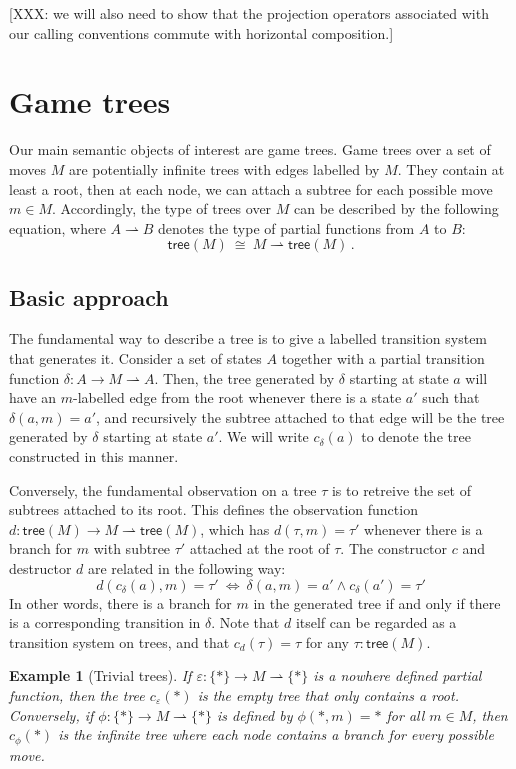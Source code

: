 \documentclass[11pt]{article}
\newcommand{\kw}[1]{{\mathsf{#1}}}
\newtheorem{example}{Example}
\begin{document}
[XXX: we will also need to show that the projection operators
associated with our calling conventions
commute with horizontal composition.]


\section{Game trees}

Our main semantic objects of interest are game trees.
Game trees over a set of moves $M$
are potentially infinite trees with
edges labelled by $M$.
They contain at least a root,
then at each node,
we can attach a subtree
for each possible move $m \in M$.
Accordingly,
the type of trees over $M$ can be described by the following equation,
where $A \rightharpoonup B$ denotes the type of
partial functions from $A$ to $B$:
\[
    \kw{tree}(M) \:\cong\: M \rightharpoonup \kw{tree}(M) \,.
\]

\subsection{Basic approach}

The fundamental way to describe a tree is to
give a labelled transition system that generates it.
Consider a set of states $A$ together with
a partial transition function $\delta : A \rightarrow M \rightharpoonup A$.
Then, the tree generated by $\delta$ starting at state $a$
will have an $m$-labelled edge from the root
whenever there is a state $a'$ such that $\delta(a, m) = a'$,
and recursively the subtree attached to that edge
will be the tree generated by $\delta$ starting at state $a'$.
We will write $c_\delta(a)$ to denote
the tree constructed in this manner.

Conversely,
the fundamental observation on a tree $\tau$
is to retreive the set of subtrees attached to its root.
This defines the observation function
$d : \kw{tree}(M) \rightarrow M \rightharpoonup \kw{tree}(M)$,
which has $d(\tau, m) = \tau'$
whenever there is a branch for $m$ with subtree $\tau'$
attached at the root of $\tau$.
The constructor $c$ and destructor $d$ are related in the following way:
\[
  d(c_\delta(a), m) = \tau'
  \:\Leftrightarrow\: 
  \delta(a, m) = a' \wedge c_\delta(a') = \tau'
\]
In other words,
there is a branch for $m$ in the generated tree
if and only if there is a corresponding transition in $\delta$. 
Note that $d$ itself can be regarded as a transition system on trees,
and that $c_d(\tau) = \tau$ for any $\tau : \kw{tree}(M)$.

\begin{example}[Trivial trees]
If $\varepsilon : \{*\} \rightarrow M \rightharpoonup \{*\}$
is a nowhere defined partial function,
then the tree $c_\varepsilon(*)$
is the empty tree that only contains a root.
Conversely,
if $\phi : \{*\} \rightarrow M \rightharpoonup \{*\}$
is defined by $\phi(*, m) = *$ for all $m \in M$,
then $c_\phi(*)$ is the infinite tree
where each node contains a branch for every possible move.
\end{example}
\end{document}
